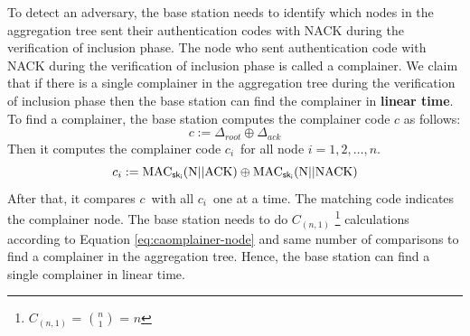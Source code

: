 		To detect an adversary, the base station needs to identify which nodes in the aggregation tree sent their authentication codes with NACK during the verification of inclusion phase.
		The node who sent authentication code with NACK during the verification of inclusion phase is called a complainer. 
		We claim that if there is a single complainer in the aggregation tree during the verification of inclusion phase then the base station can find the complainer in \textbf{linear time}.
		To find a complainer, the base station computes the complainer code $c$ as follows:
		\begin{equation}
			\label{eq:complainer}
			c := \Delta_{root} \oplus \Delta_{ack}
		\end{equation}
		Then it computes the complainer code $c_{i}$\ for all node $i = 1, 2, \dotsc, n$. 
		\begin{equation}
			\label{eq:caomplainer-node}
			c_{i} := \mbox{MAC}_{\sf{sk}_{i}}(\mbox{N} || \mbox{ACK}) \oplus \mbox{MAC}_{\sf{sk}_{i}}(\mbox{N} || \mbox{NACK})
		\end{equation}
		After that, it compares $c$\ with all $c_{i}$\ one at a time. 
		The matching code indicates the complainer node.
		The base station needs to do $C_{(n,1)}$ \footnote{$C_{(n,1)}$ = $n \choose 1 $ = $n$} calculations according to Equation \ref{eq:caomplainer-node} and same number of comparisons to find a complainer in the aggregation tree. 
		Hence, the base station can find a single complainer in linear time.
